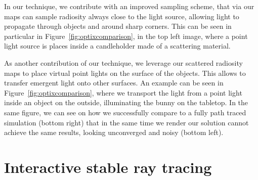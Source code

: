 In our technique, we contribute with an improved sampling scheme, that via our maps can sample radiosity always close to the light source, allowing light to propagate through objects and around sharp corners. This can be seen in particular in Figure~\ref{fig:optixcomparison}, in the top left image, where a point light source is places inside a candleholder made of a scattering material.  



As another contribution of our technique, we leverage our scattered radiosity maps to place virtual point lights on the surface of the objects. This allows to transfer emergent light onto other surfaces. An example can be seen in Figure~\ref{fig:optixcomparison}, where we transport the light from a point light inside an object on the outside, illuminating the bunny on the tabletop. In the same figure, we can see on how we successfully compare to a fully path traced simulation (bottom right) that in the same time we render our solution cannot achieve the same results, looking unconverged and noisy (bottom left).



\section{Interactive stable ray tracing}

